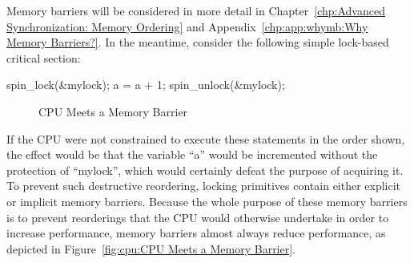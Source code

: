Memory barriers will be considered in more detail in
Chapter~\ref{chp:Advanced Synchronization: Memory Ordering} and
Appendix~\ref{chp:app:whymb:Why Memory Barriers?}.
In the meantime, consider the following simple lock-based critical
section:

\begin{VerbatimN}
spin_lock(&mylock);
a = a + 1;
spin_unlock(&mylock);
\end{VerbatimN}

\begin{figure}[tb]
\centering
{}
\caption{CPU Meets a Memory Barrier}
\end{figure}

If the CPU were not constrained to execute these statements in the
order shown, the effect would be that the variable ``a'' would be
incremented without the protection of ``mylock'', which would certainly
defeat the purpose of acquiring it.
To prevent such destructive reordering, locking primitives contain
either explicit or implicit memory barriers.
Because the whole purpose of these memory barriers is to prevent reorderings
that the CPU would otherwise undertake in order to increase performance,
memory barriers almost always reduce performance, as depicted in
Figure~\ref{fig:cpu:CPU Meets a Memory Barrier}.


